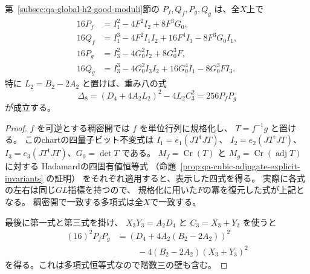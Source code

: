 \begin{lemma}[交差縮約の多項式と中央判別式]
\label{lem:qa-global-h2-gram-cross-polynomials}
第~\ref{subsec:qa-global-h2-good-moduli}節の
$P_f,Q_f,P_g,Q_g$ は、全$X$上で
\[
 \begin{aligned}
 16P_f&=I_1^2-4F^2I_2+8F^3G_0,\\
 16Q_f&=I_1^3-4F^2I_1I_2+16F^4I_3-8F^3G_0I_1,\\
 16P_g&=I_3^2-4G_0^2I_2+8G_0^3F,\\
 16Q_g&=I_3^3-4G_0^2I_3I_2+16G_0^4I_1-8G_0^3FI_3.
 \end{aligned}
 \tag{PQGP}\label{eq:qa-global-h2-cross-pencil-identities}
\]
特に $L_2=B_2-2A_2$ と置けば、重み八の式
\[
 \boxed{\quad
 \Delta_8=(D_4+4A_2L_2)^2-4L_2C_3^2
             =256P_fP_g
 \quad}
 \tag{D8}\label{eq:qa-global-h2-central-discriminant}
\]
が成立する。
\end{lemma}
\begin{proof}
$f$ を可逆とする稠密開では $f$ を単位行列に規格化し、
$T=f^{-1}g$ と置ける。
このchartの四量子ビット不変式は
$I_1=e_1(JT^{\mathrm t}JT)$、
$I_2=e_2(JT^{\mathrm t}JT)$、
$I_3=e_3(JT^{\mathrm t}JT)$、$G_0=\det T$ である。
$M_f=\operatorname{Cr}(T)$ と
$M_g=\operatorname{Cr}(\operatorname{adj}T)$ に対する
Hadamardの四固有値恒等式
（命題~\ref{prop:qa-cubic-adjugate-explicit-invariants} の証明）
をそれぞれ適用すると、表示した四式を得る。
実際に各式の左右は同じ$GL$指標を持つので、
規格化に用いた$F$の冪を復元した式が上記となる。
稠密開で一致する多項式は全$X$で一致する。

最後に第一式と第三式を掛け、
$X_3Y_3=A_2D_4$ と $C_3=X_3+Y_3$ を使うと
\[
 \begin{split}
 (16)^2P_fP_g
 &= (D_4+4A_2(B_2-2A_2))^2\\
 &\hspace{1cm}-4(B_2-2A_2)(X_3+Y_3)^2
 \end{split}
\]
を得る。これは多項式恒等式なので階数三の壁も含む。
\end{proof}

